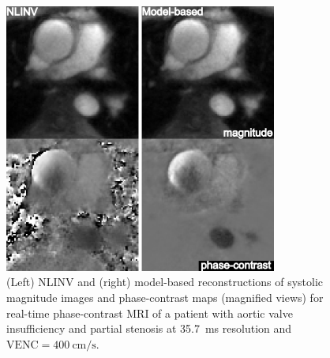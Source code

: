 \begin{figure}[tb]
  \centering
  \includegraphics[width=0.80\textwidth]{fig/mir-pc-pat.png}
  \caption{(Left) NLINV and (right) model-based reconstructions of systolic magnitude images and phase-contrast maps (magnified views) for real-time phase-contrast MRI of a patient with aortic valve insufficiency and partial stenosis at \SI{35.7}{\ms} resolution and $\text{VENC} = \SI{400}{\cm\per\second}$.} \label{Fig:mir-pc-pat}
\end{figure}

